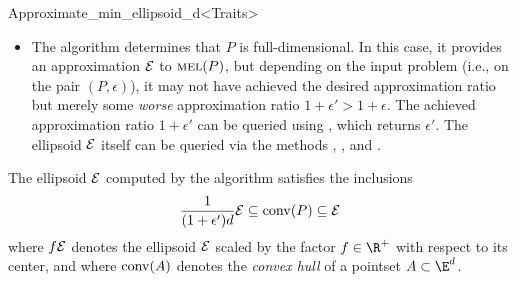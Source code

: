 \begin{ccRefClass}{Approximate_min_ellipsoid_d<Traits>}
\begin{itemize}
  \emph{Important note:} due to rounding errors, the algorithm cannot
  in all cases decide correctly whether $P$ is full-dimensional or
  not.  If  returns , the points
  lie in such a ``thin'' subspace of $\E^d$ that the algorithm is
  incapable of computing an approximation to $\mel(P)$.  More
  precisely, if  returns , there
  exist two parallel hyperplanes in $\E^d$ with the points $P$ in
  between so that the distance $\delta$ between the hyperplanes is
  very small, possible zero. (If $\delta=0$ then $P$ is not
  full-dimensional.)

  If $P$ is not full-dimensional, linear algebra techniques should be
  used to determine an affine subspace $S$ of $\E^d$ that contains the
  points $P$ as a (w.r.t.\ $S$) full-dimensional pointset; once $S$ is
  determined, the algorithm can be invoked again to compute an
  approximation to (the lower-dimensional) $\mel(P)$ in $S$.  Since
   might (due to rounding errors, see
  above) return  even though $P$ is full-dimensional, the
  lower-dimensional subspace $S$ containing $P$ need not exist.
  Therefore, it might be more advisable to fit a hyperplane $H$
  through the pointset $P$, project $P$ onto this affine subspace $H$,
  and compute an approximation to the minimum-volume enclosing
  ellipsoid of the projected points within $H$; the fitting can be
  done for instance using the 
  function from the \cgal package .
\item The algorithm determines that $P$ is full-dimensional.  In this
  case, it provides an approximation ${\cal E}$ to $\mel(P)$, but
  depending on the input problem (i.e., on the pair $(P,\epsilon)$),
  it may not have achieved the desired approximation ratio but merely
  some \emph{worse} approximation ratio $1+\epsilon'>1+\epsilon$.  The
  achieved approximation ratio $1+\epsilon'$ can be queried using
  , which returns $\epsilon'$. The ellipsoid
  ${\cal E}$ itself can be queried via the methods
  , , and
  .
\end{itemize}

The ellipsoid ${\cal E}$ computed by the algorithm satisfies the inclusions
\begin{equation}
  \label{eq:approximate_min_ellipsoid_incl}
\frac{1}{(1+\epsilon')d} {\cal E} \subseteq \mathop{\rm
conv}\nolimits(P) \subseteq {\cal E}
\end{equation}
where $f {\cal E}$ denotes the ellipsoid ${\cal E}$ scaled by the
factor $f\in\R^+$ with respect to its center, and where $\mathop{\rm
conv}\nolimits(A)$ denotes the \emph{convex hull} of a pointset
$A\subset \E^d$.


\end{ccRefClass}

